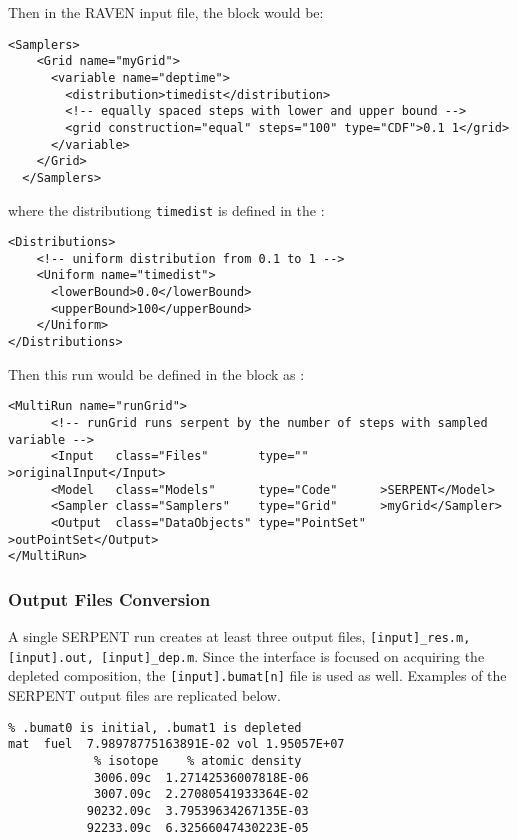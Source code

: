 Then in the RAVEN input file, the  block would be:
\begin{lstlisting}[style=XML]
  <Samplers>
    <Grid name="myGrid">
      <variable name="deptime">
        <distribution>timedist</distribution>
        <!-- equally spaced steps with lower and upper bound -->
        <grid construction="equal" steps="100" type="CDF">0.1 1</grid>
      </variable>
    </Grid>
  </Samplers>
\end{lstlisting}
where the distributiong \texttt{timedist} is defined in the :
\begin{lstlisting}[style=XML]
  <Distributions>
    <!-- uniform distribution from 0.1 to 1 -->
    <Uniform name="timedist">
      <lowerBound>0.0</lowerBound>
      <upperBound>100</upperBound>
    </Uniform>
</Distributions>
\end{lstlisting}

Then this run would be defined in the  block as :
\begin{lstlisting}[style=XML]
<MultiRun name="runGrid">
      <!-- runGrid runs serpent by the number of steps with sampled variable -->
      <Input   class="Files"       type=""          >originalInput</Input>
      <Model   class="Models"      type="Code"      >SERPENT</Model>
      <Sampler class="Samplers"    type="Grid"      >myGrid</Sampler>
      <Output  class="DataObjects" type="PointSet"  >outPointSet</Output>
</MultiRun>
\end{lstlisting}

\subsubsection{Output Files Conversion}
A single SERPENT run creates at least three output files,
\texttt{[input]\_res.m, [input].out, [input]\_dep.m}.
Since the interface is
focused on acquiring the depleted composition, the \texttt{[input].bumat[n]}
file is used as well. Examples of the SERPENT output files are replicated below.

\begin{lstlisting}[language={}]
% bumat file
% .bumat0 is initial, .bumat1 is depleted
mat  fuel  7.98978775163891E-02 vol 1.95057E+07
            % isotope    % atomic density
            3006.09c  1.27142536007818E-06
            3007.09c  2.27080541933364E-02
           90232.09c  3.79539634267135E-03
           92233.09c  6.32566047430223E-05
\end{lstlisting}

